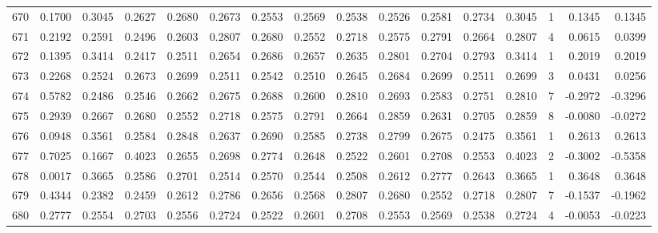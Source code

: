 \begin{tabular}{lrrrrrrrrrrrrrrr}
670 &      0.1700 &  0.3045 &  0.2627 &  0.2680 &  0.2673 &  0.2553 &  0.2569 &  0.2538 &  0.2526 &  0.2581 &   0.2734 &     0.3045 &      1 &                    0.1345 &                     0.1345 \\
671 &      0.2192 &  0.2591 &  0.2496 &  0.2603 &  0.2807 &  0.2680 &  0.2552 &  0.2718 &  0.2575 &  0.2791 &   0.2664 &     0.2807 &      4 &                    0.0615 &                     0.0399 \\
672 &      0.1395 &  0.3414 &  0.2417 &  0.2511 &  0.2654 &  0.2686 &  0.2657 &  0.2635 &  0.2801 &  0.2704 &   0.2793 &     0.3414 &      1 &                    0.2019 &                     0.2019 \\
673 &      0.2268 &  0.2524 &  0.2673 &  0.2699 &  0.2511 &  0.2542 &  0.2510 &  0.2645 &  0.2684 &  0.2699 &   0.2511 &     0.2699 &      3 &                    0.0431 &                     0.0256 \\
674 &      0.5782 &  0.2486 &  0.2546 &  0.2662 &  0.2675 &  0.2688 &  0.2600 &  0.2810 &  0.2693 &  0.2583 &   0.2751 &     0.2810 &      7 &                   -0.2972 &                    -0.3296 \\
675 &      0.2939 &  0.2667 &  0.2680 &  0.2552 &  0.2718 &  0.2575 &  0.2791 &  0.2664 &  0.2859 &  0.2631 &   0.2705 &     0.2859 &      8 &                   -0.0080 &                    -0.0272 \\
676 &      0.0948 &  0.3561 &  0.2584 &  0.2848 &  0.2637 &  0.2690 &  0.2585 &  0.2738 &  0.2799 &  0.2675 &   0.2475 &     0.3561 &      1 &                    0.2613 &                     0.2613 \\
677 &      0.7025 &  0.1667 &  0.4023 &  0.2655 &  0.2698 &  0.2774 &  0.2648 &  0.2522 &  0.2601 &  0.2708 &   0.2553 &     0.4023 &      2 &                   -0.3002 &                    -0.5358 \\
678 &      0.0017 &  0.3665 &  0.2586 &  0.2701 &  0.2514 &  0.2570 &  0.2544 &  0.2508 &  0.2612 &  0.2777 &   0.2643 &     0.3665 &      1 &                    0.3648 &                     0.3648 \\
679 &      0.4344 &  0.2382 &  0.2459 &  0.2612 &  0.2786 &  0.2656 &  0.2568 &  0.2807 &  0.2680 &  0.2552 &   0.2718 &     0.2807 &      7 &                   -0.1537 &                    -0.1962 \\
680 &      0.2777 &  0.2554 &  0.2703 &  0.2556 &  0.2724 &  0.2522 &  0.2601 &  0.2708 &  0.2553 &  0.2569 &   0.2538 &     0.2724 &      4 &                   -0.0053 &                    -0.0223 \\

\end{tabular}
